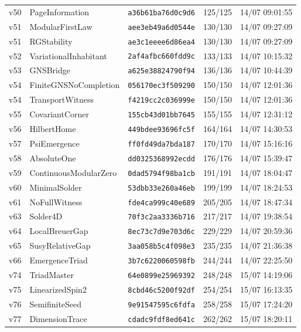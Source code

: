 \documentclass[11pt]{article}
\theoremstyle{definition}\newtheorem{deriv}{Derivation}
\begin{document}
{\begin{longtable}{@{}lllll@{}}
v50 & PageInformation & \texttt{a36b61ba76d0c9d6} & 125/125 & 14/07 09:01:55 \\
v51 & ModularFirstLaw & \texttt{aee3eb49a6d0544e} & 130/130 & 14/07 09:27:09 \\
v51 & RGStability & \texttt{ae3c1eeee6d86ea4} & 130/130 & 14/07 09:27:09 \\
v52 & VariationalInhabitant & \texttt{2af4afbc660fdd9c} & 133/133 & 14/07 10:15:32 \\
v53 & GNSBridge & \texttt{a625e38824790f94} & 136/136 & 14/07 10:44:39 \\
v54 & FiniteGNSNoCompletion & \texttt{056170ec3f509290} & 150/150 & 14/07 12:01:36 \\
v54 & TransportWitness & \texttt{f4219cc2c036999e} & 150/150 & 14/07 12:01:36 \\
v55 & CovariantCorner & \texttt{155cb43d01bb7645} & 155/155 & 14/07 12:31:12 \\
v56 & HilbertHome & \texttt{449bdee93696fc5f} & 164/164 & 14/07 14:30:53 \\
v57 & PsiEmergence & \texttt{ff0fd49da7bda187} & 170/170 & 14/07 15:16:16 \\
v58 & AbsoluteOne & \texttt{dd0325368992ecdd} & 176/176 & 14/07 15:39:47 \\
v59 & ContinuousModularZero & \texttt{0dad5794f98ba1cb} & 191/191 & 14/07 18:04:47 \\
v60 & MinimalSolder & \texttt{53dbb33e260a46eb} & 199/199 & 14/07 18:24:53 \\
v61 & NoFullWitness & \texttt{fde4ca999c40e689} & 205/205 & 14/07 18:47:34 \\
v63 & Solder4D & \texttt{70f3c2aa3336b716} & 217/217 & 14/07 19:38:54 \\
v64 & LocalBreuerGap & \texttt{8ec73c7d9e703d6c} & 229/229 & 14/07 20:59:36 \\
v65 & SusyRelativeGap & \texttt{3aa058b5c4f098e3} & 235/235 & 14/07 21:36:38 \\
v66 & EmergenceTriad & \texttt{3b7c6220060598fb} & 244/244 & 14/07 22:25:50 \\
v74 & TriadMaster & \texttt{64e0899e25969392} & 248/248 & 15/07 14:19:06 \\
v75 & LinearizedSpin2 & \texttt{8cbd46c5200f92df} & 254/254 & 15/07 16:13:35 \\
v76 & SemifiniteSeed & \texttt{9e91547595c6fdfa} & 258/258 & 15/07 17:24:20 \\
v77 & DimensionTrace & \texttt{cdadc9fdf8ed641c} & 262/262 & 15/07 18:20:11 \\

\end{longtable}}
\end{document}
